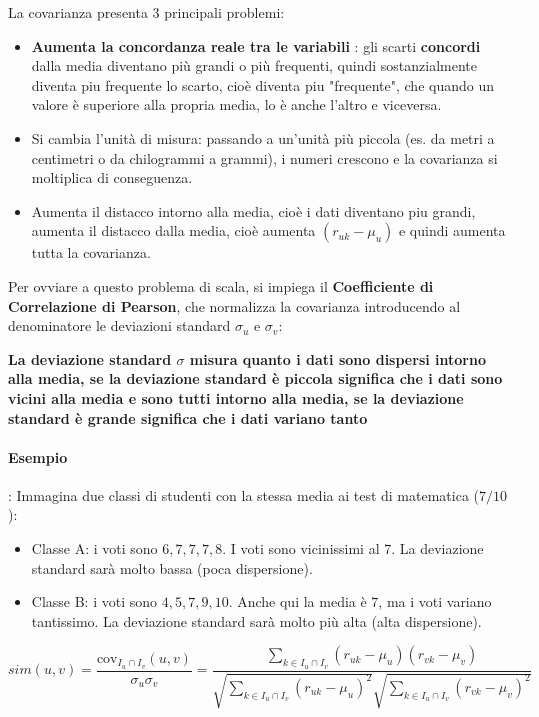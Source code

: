 La covarianza presenta 3 principali problemi:
\begin{itemize}
    \item \textbf{Aumenta la concordanza reale tra le variabili} : gli scarti \textbf{concordi} dalla media diventano più grandi o più frequenti, quindi sostanzialmente diventa piu frequente lo scarto,
    cioè diventa piu "frequente", che quando un valore è superiore alla propria media, lo è anche l'altro e viceversa.
    \item Si cambia l'unità di misura: passando a un'unità più piccola (es. da metri a centimetri o da chilogrammi a grammi), i numeri crescono e la covarianza si moltiplica di conseguenza.
    \item Aumenta il distacco intorno alla media, cioè i dati diventano piu grandi, aumenta il distacco dalla media, cioè aumenta $(r_{uk} - \mu_u)$ e quindi aumenta tutta la covarianza.
\end{itemize}

Per ovviare a questo problema di scala, si impiega il \textbf{Coefficiente di Correlazione di Pearson}, che normalizza la covarianza introducendo al denominatore le deviazioni standard $\sigma_u$ e $\sigma_v$:

\textbf{La deviazione standard $\sigma$ misura quanto i dati sono dispersi intorno alla media, se la deviazione standard è piccola significa che i dati sono vicini alla media e sono tutti intorno alla media, se la deviazione standard è grande significa che i dati variano tanto}
\paragraph{Esempio}: Immagina due classi di studenti con la stessa media ai test di matematica ($7/10$):
\begin{itemize}
    \item Classe A: i voti sono $6, 7, 7, 7, 8$. I voti sono vicinissimi al $7$. La deviazione standard sarà molto bassa (poca dispersione).
    \item Classe B: i voti sono $4, 5, 7, 9, 10$. Anche qui la media è $7$, ma i voti variano tantissimo. La deviazione standard sarà molto più alta (alta dispersione).
\end{itemize}


$$sim(u,v) = \frac{\text{cov}_{I_u \cap I_v}(u,v)}{\sigma_u \sigma_v} = \frac{\sum_{k \in I_u \cap I_v} (r_{uk} - \mu_u)(r_{vk} - \mu_v)}{\sqrt{\sum_{k \in I_u \cap I_v} (r_{uk} - \mu_u)^2} \sqrt{\sum_{k \in I_u \cap I_v} (r_{vk} - \mu_v)^2}}$$


